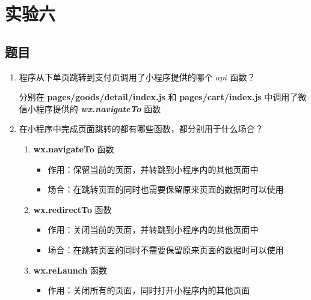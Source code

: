 \section{实验六}
    \subsection{题目}
        \begin{enumerate}
            \item 程序从下单页跳转到支付页调用了小程序提供的哪个 $api$ 函数？
                \begin{mquote}
                    \par 分别在 \textbf{pages/goods/detail/index.js} 和 \textbf{pages/cart/index.js} 中调用了微信小程序提供的 \textbf{\textit{wx.navigateTo}} 函数
                \end{mquote}
                
                
            \item 在小程序中完成页面跳转的都有哪些函数，都分别用于什么场合？
                \begin{mquote}
                    \begin{enumerate}
                        \item \textbf{wx.navigateTo} 函数
                            \begin{itemize}
                                \item 作用：保留当前的页面，并转跳到小程序内的其他页面中
                                \item 场合：在跳转页面的同时也需要保留原来页面的数据时可以使用
                            \end{itemize}
                        \item \textbf{wx.redirectTo} 函数
                            \begin{itemize}
                                \item 作用：关闭当前的页面，并转跳到小程序内的其他页面中
                                \item 场合：在跳转页面的同时不需要保留原来页面的数据时可以使用
                            \end{itemize}
                        \item \textbf{wx.reLaunch} 函数
                            \begin{itemize}
                                \item 作用：关闭所有的页面，同时打开小程序内的其他页面

\end{itemize}
\end{enumerate}
\end{mquote}
\end{enumerate}
